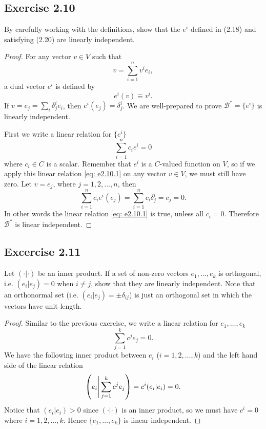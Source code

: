 \documentclass[10pt]{article}
\begin{document}
\subsection{Exercise 2.10}
By carefully working with the definitions, show that the $e^i$ defined in (2.18) and satisfying (2.20) are linearly independent.

\begin{proof}
	For any vector $v \in V$ such that
	\begin{equation}
		v = \sum_{i=1}^n v^i e_i,
	\end{equation}
	a dual vector $e^i$ is defined by
	\begin{equation}
		e^i (v) \equiv v^i.
	\end{equation}
	If $v = e_j = \sum_i \delta_j^i e_i$, then $e^i(e_j) = \delta_j^i$.
	We are well-prepared to prove $\mathcal{B}^* = \{e^i\}$ is linearly independent.

	First we write a linear relation for $\{e^i\}$
	\begin{equation}
		\sum_{i=1}^n c_i e^i = 0 \label{eq: e2.10.1}
	\end{equation}
	where $c_i \in C$ is a scalar. Remember that $e^i$ is a $C$-valued function on $V$, so if we apply this linear relation \eqref{eq: e2.10.1} on any vector $v \in V$, we must still have zero. Let $v = e_j$, where $j = 1, 2, \dots, n$, then
	\begin{equation}
		\sum_{i=1}^n c_i e^i (e_j) = \sum_{i=1}^n c_i \delta_j^i = c_j = 0.
	\end{equation}
	In other words the linear relation \eqref{eq: e2.10.1} is true, unless all $c_i = 0$. Therefore $\mathcal{B}^*$ is linear independent.
\end{proof}

\subsection{Excercise 2.11}
Let $(\cdot|\cdot)$ be an inner product. If a set of non-zero vectors $e_1, \dots, e_k$ is orthogonal, i.e. $(e_i|e_j) = 0$ when $i \neq j$, show that they are linearly independent. Note that an orthonormal set (i.e. $(e_i|e_j) = \pm \delta_{ij}$) is just an orthogonal set in which the vectors have unit length.

\begin{proof}
	Similar to the previous exercise, we write a linear relation for $e_1, \dots, e_k$
	\begin{equation}
		\sum_{j=1}^k c^j e_j = 0.
	\end{equation}
	We have the following inner product between $e_i$ ($i = 1, 2, \dots, k$) and the left hand side of the linear relation
	\begin{equation}
		\qty(e_i\Bigg{|}\sum_{j=1}^k c^j e_j) = c^i (e_i|e_i) = 0.
	\end{equation}
	Notice that $(e_i|e_i) > 0$ since $(\cdot|\cdot)$ is an inner product, so we must have $c^i = 0$ where $i = 1, 2, \dots, k$. Hence $\{e_1, \dots, e_k\}$ is linear independent.
\end{proof}
\end{document}
